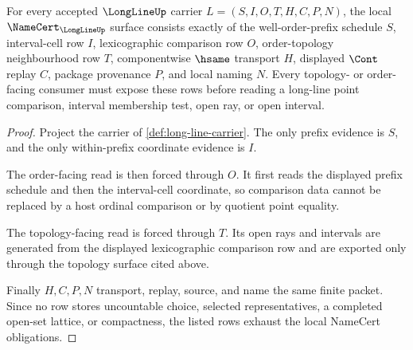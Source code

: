 \begin{theorem}
\label{thm:long-line-namecert-obligations}
For every accepted $\LongLineUp$ carrier $L=(S,I,O,T,H,C,P,N)$, the local $\NameCert_{\LongLineUp}$ surface consists exactly of the well-order-prefix schedule $S$, interval-cell row $I$, lexicographic comparison row $O$, order-topology neighbourhood row $T$, componentwise $\hsame$ transport $H$, displayed $\Cont$ replay $C$, package provenance $P$, and local naming $N$. Every topology- or order-facing consumer must expose these rows before reading a long-line point comparison, interval membership test, open ray, or open interval.
\end{theorem}
\begin{proof}
Project the carrier of \autoref{def:long-line-carrier}. The only prefix evidence is $S$, and the only within-prefix coordinate evidence is $I$.

The order-facing read is then forced through $O$. It first reads the displayed prefix schedule and then the interval-cell coordinate, so comparison data cannot be replaced by a host ordinal comparison or by quotient point equality.

The topology-facing read is forced through $T$. Its open rays and intervals are generated from the displayed lexicographic comparison row and are exported only through the topology surface cited above.

Finally $H,C,P,N$ transport, replay, source, and name the same finite packet. Since no row stores uncountable choice, selected representatives, a completed open-set lattice, or compactness, the listed rows exhaust the local NameCert obligations.
\end{proof}


